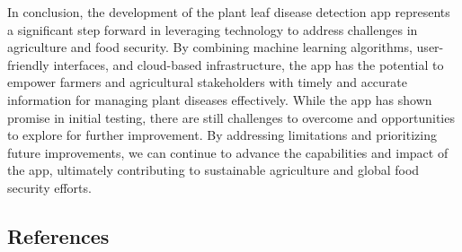 \documentclass{article}
\begin{document}
In conclusion, the development of the plant leaf disease detection app represents a significant step forward in leveraging technology to address challenges in agriculture and food security. By combining machine learning algorithms, user-friendly interfaces, and cloud-based infrastructure, the app has the potential to empower farmers and agricultural stakeholders with timely and accurate information for managing plant diseases effectively. While the app has shown promise in initial testing, there are still challenges to overcome and opportunities to explore for further improvement. By addressing limitations and prioritizing future improvements, we can continue to advance the capabilities and impact of the app, ultimately contributing to sustainable agriculture and global food security efforts.


\subsection*{References}
\end{document}
